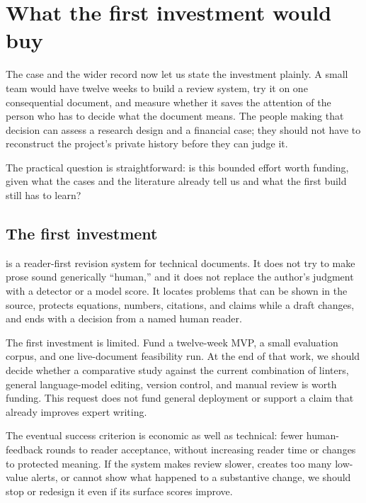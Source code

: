 \chapter{What the first investment would buy}
\label{sec:opening}

The case and the wider record now let us state the investment plainly. A small
team would have twelve weeks to build a review system, try it on one
consequential document, and measure whether it saves the attention of the
person who has to decide what the document means. The people making that
decision can assess a research design and a financial case; they should not
have to reconstruct the project's private history before they can judge it.

The practical question is straightforward: is this bounded effort worth
funding, given what the cases and the literature already tell us and what the
first build still has to learn?

\section{The first investment}

\hv{} is a reader-first revision system for technical documents. It does not
try to make prose sound generically ``human,'' and it does not replace the
author's judgment with a detector or a model score. It locates problems that
can be shown in the source, protects equations, numbers, citations, and claims
while a draft changes, and ends with a decision from a named human reader.

The first investment is limited. Fund a twelve-week MVP, a small evaluation
corpus, and one live-document feasibility run. At the end of that work, we
should decide whether a comparative study against the current
combination of linters, general language-model editing, version control, and
manual review is worth funding. This request does not fund general
deployment or support a claim that \hv{} already improves expert writing.

The eventual success criterion is economic as well as technical: fewer
human-feedback rounds to reader acceptance, without increasing reader time or
changes to protected meaning. If the system makes review slower, creates too
many low-value alerts, or cannot show what happened to a substantive change,
we should stop or redesign it even if its surface scores improve.

